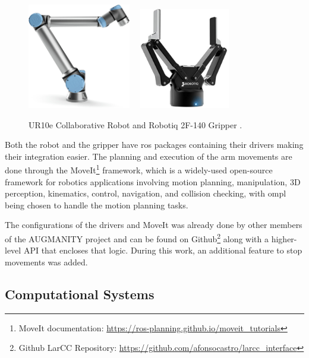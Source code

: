\begin{figure}[ht]
    \centerline{\includegraphics[width=0.4\textwidth]{figs/UR10e.jpg} \ \ \includegraphics[width=0.35\textwidth]{figs/robotiq-2f-140.jpg}}
    \caption[UR10e Collaborative Robot and Robotiq 2F-140 Gripper.]{UR10e Collaborative Robot \cite{UR10e_image} and Robotiq 2F-140 Gripper \cite{robotiq_gripper}.}
    \label{fig:ur10e}
\end{figure}

Both the robot and the gripper have \acs{ros} packages containing their drivers making their integration easier. The planning and execution of the arm movements are done through the MoveIt\footnote{MoveIt documentation: \url{https://ros-planning.github.io/moveit_tutorials}} framework, which is a widely-used open-source framework for robotics applications involving motion planning, manipulation, 3D perception, kinematics, control, navigation, and collision checking, with \acs{ompl} being chosen to handle the motion planning tasks.

The configurations of the drivers and MoveIt was already done by other members of the AUGMANITY project and can be found on Github\footnote{Github LarCC Repository: \url{https://github.com/afonsocastro/larcc_interface}} along with a higher-level API that encloses that logic. During this work, an additional feature to stop movements was added.

\subsection{Computational Systems}

